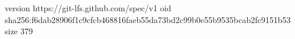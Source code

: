 version https://git-lfs.github.com/spec/v1
oid sha256:f6dab28906f1c9cfcb468816faeb55da73bd2c99b0e55b9535bcab2fc9151b53
size 379
